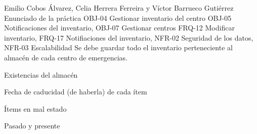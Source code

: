 {Emilio Cobos Álvarez, Celia Herrera Ferreira y Víctor Barrueco Gutiérrez}
{Enunciado de la práctica}
{OBJ-04 Gestionar inventario del centro OBJ-05 Notificaciones del inventario, OBJ-07 Gestionar centros}
{FRQ-12 Modificar inventario, FRQ-17 Notifiaciones del inventario, NFR-02 Seguridad de los datos, NFR-03 Escalabilidad}
{Se debe guardar todo el inventario perteneciente al almacén de cada centro de emergencias.}
{
\item{Existencias del almacén}
\item{Fecha de caducidad (de haberla) de cada ítem}
\item{Ítems en mal estado}
}
{Pasado y presente}

